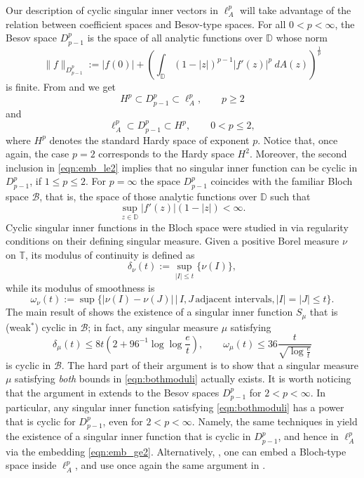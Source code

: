 \documentclass{birkjour}
\numberwithin{equation}{section}
\theoremstyle{plain}
\theoremstyle{definition}
\newcommand{\T}{\mathbb{T}}
\newcommand{\D}{\mathbb{D}}
\newcommand{\B}{\mathcal{B}}
\newcommand{\1}{\mathds{1}}
\begin{document}
Our description of cyclic singular inner vectors in $\ell^p_A$ will take advantage of the relation between coefficient spaces and Besov-type spaces. For all $0< p<\infty$, the Besov space $D^p_{p-1}$ is the space of all analytic functions over $\D$ whose norm
\[
\|f\|_{D^p_{p-1}}:=|f(0)|+\left(\int_\D(1-|z|)^{p-1}|f'(z)|^p~dA(z)\right)^\frac{1}{p}
\]
is finite. 
From \cite[Th. 1.1, (ii) and Th. 1.2]{Girela06} and \cite[Th. 7.1]{Pavlovic} we get
\begin{equation}
\label{eqn:emb_ge2}
H^p\subset D^p_{p-1}\subset\ell^p_A,\qquad p\ge 2
\end{equation}
and 
\begin{equation}
\label{eqn:emb_le2}
\ell^p_A\subset D^p_{p-1}\subset H^p,\qquad 0<p\le2,
\end{equation}
where $H^p$ denotes the standard Hardy space of exponent $p$. Notice that, once again, the case $p=2$ corresponds to the Hardy space $H^2$. Moreover, the second inclusion in \eqref{eqn:emb_le2} implies that no singular inner function can be cyclic in $D^p_{p-1}$, if $1\le p\le 2$. For $p=\infty$ the space $D^p_{p-1}$ coincides with the familiar Bloch space $\B$, that is, the space of those analytic functions over $\D$ such that
\begin{equation}
\label{eqn:bloch}
\sup_{z\in\D}|f'(z)|(1-|z|)<\infty.
\end{equation}
Cyclic singular inner functions in the Bloch space were studied in \cite{Anderson91} via regularity conditions on their defining singular measure. Given a positive Borel measure $\nu$ on $\T$, its modulus of continuity is defined as
\[
\delta_\nu(t):=\sup_{|I|\le t}\{\nu(I)\},
\] 
while its modulus of smoothness is
\[
\omega_{\nu}(t):=\sup\{|\nu(I)-\nu(J)|\,|\, I, J\,\text{adjacent intervals,}\, |I|=|J|\le t\}.
\] 
The main result of \cite{Anderson91} shows the existence of a singular inner function $S_\mu$ that is (weak$^*$) cyclic in $\B$; in fact, any singular measure $\mu$ satisfying 
\begin{equation}
\label{eqn:bothmoduli}
\delta_\mu(t)\le 8t\left(2+96^{-1}\log\log\frac{e}{t}\right), \qquad \omega_\mu(t)\le36\frac{t}{\sqrt{\log\frac{e}{t}}}
\end{equation}
is cyclic in $\B$. The hard part of their argument is to show that a singular measure $\mu$ satisfying \emph{both} bounds in \eqref{eqn:bothmoduli} actually exists.  It is worth noticing that the argument in \cite{Anderson91} extends to the Besov spaces $D^p_{p-1}$ for $2<p<\infty$. In particular, any singular inner function satisfying \eqref{eqn:bothmoduli} has a power that is cyclic for $D^p_{p-1}$, even for $2<p<\infty$. Namely, the same techniques in \cite{Anderson91} yield the existence of a singular inner function that is cyclic in $D^p_{p-1}$, and hence in $\ell^p_A$ via the embedding \eqref{eqn:emb_ge2}. Alternatively, \cite{Limani24}, one can embed a Bloch-type space inside $\ell^p_A$, and use once again the same argument in \cite{Anderson91}.\\
\end{document}
